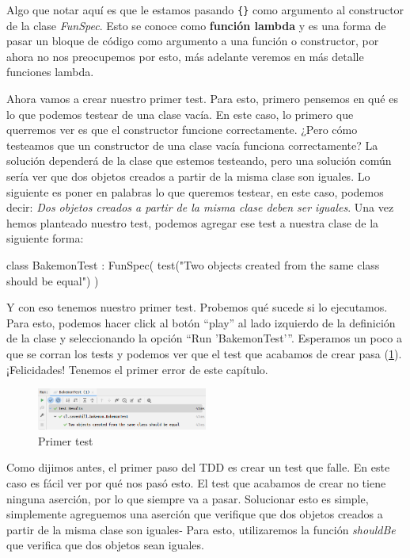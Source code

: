   Algo que notar aquí es que le estamos pasando \texttt{\{\}} como argumento al constructor de la
  clase \textit{FunSpec}.
  Esto se conoce como \textbf{función lambda} y es una forma de pasar un bloque de código como
  argumento a una función o constructor, por ahora no nos preocupemos por esto, más adelante veremos
  en más detalle funciones lambda.

  Ahora vamos a crear nuestro primer test.
  Para esto, primero pensemos en qué es lo que podemos testear de una clase vacía.
  En este caso, lo primero que querremos ver es que el constructor funcione correctamente.
  ¿Pero cómo testeamos que un constructor de una clase vacía funciona correctamente?
  La solución dependerá de la clase que estemos testeando, pero una solución común sería ver que dos
  objetos creados a partir de la misma clase son iguales.
  Lo siguiente es poner en palabras lo que queremos testear, en este caso, podemos decir: 
  \textit{Dos objetos creados a partir de la misma clase deben ser iguales}.
  Una vez hemos planteado nuestro test, podemos agregar ese test a nuestra clase de la siguiente
  forma:

  \begin{kotlin}
    class BakemonTest : FunSpec({
      test("Two objects created from the same class should be equal") {}
    })
  \end{kotlin}

  Y con eso tenemos nuestro primer test.
  Probemos qué sucede si lo ejecutamos.
  Para esto, podemos hacer click al botón \enquote{play} al lado izquierdo de la definición de la
  clase y seleccionando la opción \enquote{Run 'BakemonTest'}.
  Esperamos un poco a que se corran los tests y podemos ver que el test que acabamos de crear pasa
  (\cref{fig:primer-test}).
  ¡Felicidades!
  Tenemos el primer error de este capítulo.

  \begin{figure}[ht!]
    \centering
    \includegraphics[width=0.5\textwidth]{img/oop/tdd/kotest/kotest_primer_test.png}
    \caption{Primer test}
    \label{fig:primer-test}
  \end{figure}

  Como dijimos antes, el primer paso del TDD es crear un test que falle.
  En este caso es fácil ver por qué nos pasó esto.
  El test que acabamos de crear no tiene ninguna aserción, por lo que siempre va a pasar.
  Solucionar esto es simple, simplemente agreguemos una aserción que verifique que dos objetos
  creados a partir de la misma clase son iguales-
  Para esto, utilizaremos la función \textit{shouldBe} que verifica que dos objetos sean iguales.

